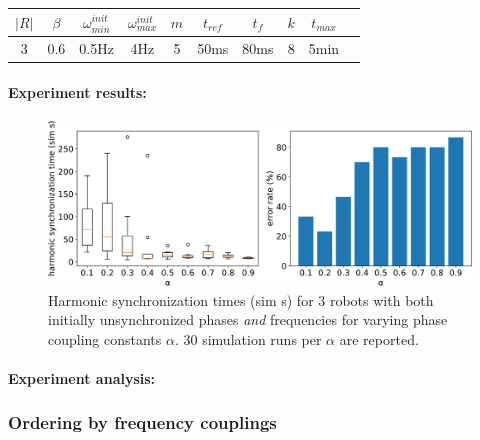 			\begin{center}
			\begin{tabular}{ |c|c|c|c|c|c|c|c|c|c| } 
			\hline
			$|R|$ & $\beta$ & $\omega_{min}^{init}$ & $\omega_{max}^{init}$ & $m$ & $t_{ref}$ & $t_f$ & $k$ & $t_{max}$ \\
			\hline
			3 & 0.6 & 0.5Hz & 4Hz & 5 & 50ms & 80ms & 8 & 5min \\
			\hline
			\end{tabular}
			\label{tab:stable_baseline_reproducing_phase_and_freq_sync_for_alpha}
			\end{center}
			
			\paragraph{Experiment results:\nl}
			
			\begin{figure}[ht!]
				\centering
				\includegraphics[width=\linewidth]{Assets/DocSegments/Chapters/ExperimentsAndResults/Figures/PerfScores/stable_baseline_reproducing_phase_and_freq_sync_for_alpha.pdf}
				\caption{Harmonic synchronization times (sim s) for 3 robots with both initially unsynchronized phases \textit{and} frequencies for varying phase coupling constants $\alpha$. 30 simulation runs per $\alpha$ are reported.}
				\label{fig:stable_baseline_reproducing_phase_and_freq_sync_for_alpha}
			\end{figure}
			
			\paragraph{Experiment analysis:\nl}
			
	
		\subsubsection{Ordering by frequency couplings}
		
